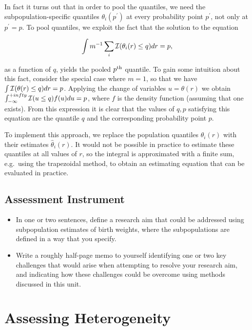 In fact it turns out that in order to pool the quantiles, we need the subpopulation-specific quantiles $\theta_i(p^\prime)$ at every probability point $p^\prime$, not only at $p^\prime = p$. To pool quantiles, we exploit the fact that the solution to the equation

$$
\int m^{-1}\sum_i {\cal I}(\theta_i(r) \le q) dr = p,
$$

\noindent as a function of $q$, yields the pooled $p^{\rm th}$ quantile.  To gain some intuition about this fact, consider the special case where $m=1$, so that we have $\int {\cal I}(\theta(r) \le q) dr = p$.  Applying the change of variables $u = \theta(r)$ we obtain $\int_{-\infty}^{+infty} {\cal I}(u \le q) f(u)du = p$, where $f$ is the density function (assuming that one exists).  From this expression it is clear that the values of $q, p$ satisfying this equation are the quantile $q$ and the corresponding probability point $p$.

To implement this approach, we replace the population quantiles $\theta_i(r)$ with their estimates $\hat{\theta}_i(r)$. It would not be possible in practice to estimate these quantiles at all values of $r$, so the integral is approximated with a finite sum, e.g.\ using the trapezoidal method, to obtain an estimating equation that can be evaluated in practice.

\subsection{Assessment Instrument}

\begin{itemize}
    \item In one or two sentences, define a research aim that could be addressed using subpopulation estimates of birth weights, where the subpopulations are defined in a way that you specify.
    \item Write a roughly half-page memo to yourself identifying one or two key challenges that would arise when attempting to resolve your research aim, and indicating how these challenges could be overcome using methods discussed in this unit.
\end{itemize}

\section{Assessing Heterogeneity}
\label{sec:6.2}

